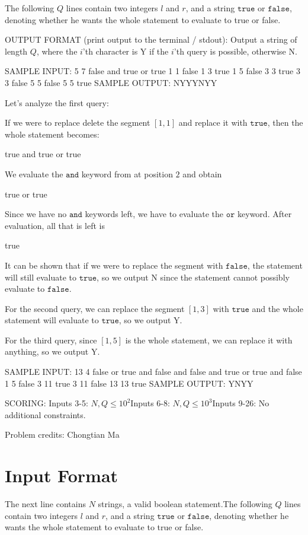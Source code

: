 \documentclass[12pt]{article}
\begin{document}
The following $Q$ lines contain two integers $l$ and $r$, and a string
$\texttt{true}$ or $\texttt{false}$, denoting whether he wants the whole
statement to evaluate to true or false.

OUTPUT FORMAT (print output to the terminal / stdout):
Output a string of length $Q$, where the $i$'th character is Y if the $i$'th
query is possible, otherwise N.

SAMPLE INPUT:
5 7
false and true or true
1 1 false
1 3 true
1 5 false
3 3 true
3 3 false
5 5 false
5 5 true
SAMPLE OUTPUT: 
NYYYNYY

Let's analyze the first query:

If we were to replace delete the segment $[1, 1]$ and replace it with
$\texttt{true}$, then the whole statement becomes:


true and true or true

We evaluate the $\texttt{and}$ keyword from at position $2$ and obtain


true or true

Since we have no $\texttt{and}$ keywords left, we have to evaluate the
$\texttt{or}$ keyword. After evaluation, all that is left is


true

It can be shown that if we were to replace the segment with $\texttt{false}$,
the statement will still evaluate to $\texttt{true}$, so we output N since the
statement cannot possibly evaluate to $\texttt{false}$.

For the second query, we can replace the segment $[1, 3]$ with $\texttt{true}$
and the whole statement will evaluate to $\texttt{true}$, so we output Y.

For the third query, since $[1, 5]$ is the whole statement, we can replace it
with anything, so we output Y.

SAMPLE INPUT:
13 4
false or true and false and false and true or true and false
1 5 false
3 11 true
3 11 false
13 13 true
SAMPLE OUTPUT: 
YNYY

SCORING:
Inputs 3-5: $N,Q\le 10^2$Inputs 6-8: $N,Q\le 10^3$Inputs 9-26: No additional constraints.


Problem credits: Chongtian Ma



\section*{Input Format}
The next line contains $N$ strings, a valid boolean statement.The following $Q$ lines contain two integers $l$ and $r$, and a string
$\texttt{true}$ or $\texttt{false}$, denoting whether he wants the whole
statement to evaluate to true or false.
\end{document}
